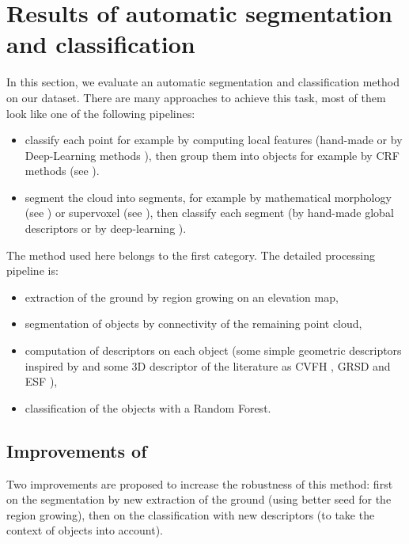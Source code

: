 \documentclass[a4paper, 10pt, journal]{article}
\begin{document}
\section{Results of automatic segmentation and classification} \label{sec:ourResults}

In this section, we evaluate an automatic segmentation and classification method on our dataset. There are many approaches to achieve this task, most of them look like one of the following pipelines:
\begin{itemize}
 \item classify each point for example by computing local features (hand-made \cite{weinmann2015semantic} or by Deep-Learning methods \cite{huang2016point}), then group them into objects for example by CRF methods (see \cite{LANDRIEU2017102}).
 \item segment the cloud into segments, for example by mathematical morphology (see \cite{serna2014detection}) or supervoxel (see \cite{aijazi2013segmentation}), then classify each segment (by hand-made global descriptors \cite{johnson1999using,velizhev2012implicit} or by deep-learning \cite{maturana2015voxnet, qi2016pointnet}).
\end{itemize}
The method used here \cite{roynard2016fast} belongs to the first category. The detailed processing pipeline is:
\begin{itemize}
 \item extraction of the ground by region growing on an elevation map,
 \item segmentation of objects by connectivity of the remaining point cloud,
 \item computation of descriptors on each object (some simple geometric descriptors inspired by \cite{serna2014detection} and some 3D descriptor of the literature as CVFH \cite{rusu2010fast}, GRSD \cite{marton2010general} and ESF \cite{osada2001matching}), 
 \item classification of the objects with a Random Forest.
\end{itemize}

\subsection{Improvements of \cite{roynard2016fast}}

Two improvements are proposed to increase the robustness of this method: first on the segmentation by new extraction of the ground (using better seed for the region growing), then on the classification with new descriptors (to take the context of objects into account).
\end{document}

